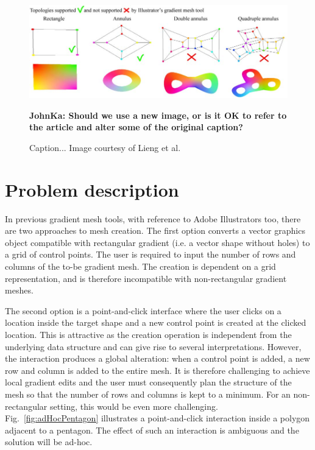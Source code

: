 \documentclass{egpubl}
\newcommand{\note}[3]{{\color{#2}\textbf{#1: #3}}}
\newcommand{\john}[1]{\note{JohnKa}{RubineRed}{#1}}
\begin{document}
	\begin{figure}
		\includegraphics[]{illustratorVsOur.jpg}
		\caption{Caption... Image courtesy of Lieng et al. \cite{Lieng:2016}}
		\john{Should we use a new image, or is it OK to refer to the article and alter some of the original caption?}
		\label{fig:IllustratorVsOur}
	\end{figure}
	
	\section{Problem description}
	\label{sec:overview}
	
	In previous gradient mesh tools, with reference to Adobe Illustrators too, there are two approaches to mesh creation. The first option converts a vector graphics object compatible with rectangular gradient (i.e. a vector shape without holes) to a grid of control points. The user is required to input the number of rows and columns of the to-be gradient mesh. The creation is dependent on a grid representation, and is therefore incompatible with non-rectangular gradient meshes.
	
	The second option is a point-and-click interface where the user clicks on a location inside the target shape and a new control point is created at the clicked location. This is attractive as the creation operation is independent from the underlying data structure and can give rise to several interpretations. However, the interaction produces a global alteration: when a control point is added, a new row and column is added to the entire mesh. It is therefore challenging to achieve local gradient edits and the user must consequently plan the structure of the mesh so that the number of rows and columns is kept to a minimum. For an non-rectangular setting, this would be even more challenging. Fig.~\ref{fig:adHocPentagon} illustrates a point-and-click interaction inside a polygon adjacent to a pentagon. The effect of such an interaction is ambiguous and the solution will be ad-hoc.
	
\end{document}
